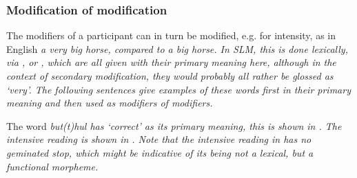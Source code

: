 %

\subsubsection{Modification of modification}\label{sec:func:Modificationofmodification}
The modifiers of a participant can in turn be modified, e.g. for intensity, as in English \em a very big horse\em, compared to \em a big horse\em. In SLM, this is done lexically, via ,  or , which are all given with their primary meaning here, although in the context of secondary modification, they would probably all rather be glossed as `very'. The following sentences give examples of these words first in their primary meaning and then used as modifiers of modifiers.

The word \em but(t)hul \em has `correct' as its primary meaning, this is shown in . The intensive reading is shown in . Note that the intensive reading in  has no geminated stop, which might be indicative of its being not a lexical, but a functional morpheme.

 \\

